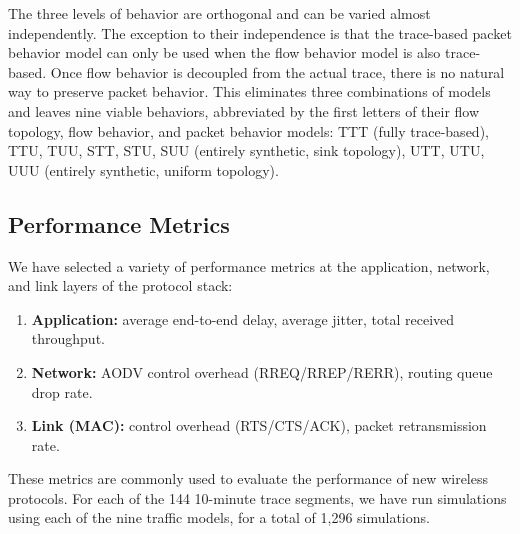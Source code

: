 \documentclass[conference]{IEEEtran}
\newcommand{\caps}[1]{{\small{#1}}}
\begin{document}

The three levels of behavior are orthogonal and can be varied almost independently. The exception to their independence is that the trace-based packet behavior model can only be used when the flow behavior model is also trace-based. Once flow behavior is decoupled from the actual trace, there is no natural way to preserve packet behavior. This eliminates three combinations of models and leaves nine viable behaviors, abbreviated by the first letters of their flow topology, flow behavior, and packet behavior models: \caps{TTT} (fully trace-based), \caps{TTU}, \caps{TUU}, \caps{STT}, \caps{STU}, \caps{SUU} (entirely synthetic, sink topology), \caps{UTT}, \caps{UTU}, \caps{UUU} (entirely synthetic, uniform topology).

\subsection{Performance Metrics}\label{sec:metrics}

We have selected a variety of performance metrics at the application, network, and link layers of the protocol stack:
\begin{enumerate}
\setlength{\itemsep}{0em}
\item \textbf{Application:} average end-to-end delay, average jitter, total received throughput.
\item \textbf{Network:} \caps{AODV} control overhead (\caps{RREQ/RREP/RERR}), routing queue drop rate.
\item \textbf{Link (\caps{MAC}):} control overhead (\caps{RTS/CTS/ACK}), packet retransmission rate.
\end{enumerate}
These metrics are commonly used to evaluate the performance of new wireless protocols. For each of the 144 10-minute trace segments, we have run simulations using each of the nine traffic models, for a total of 1,296 simulations.
\end{document}
